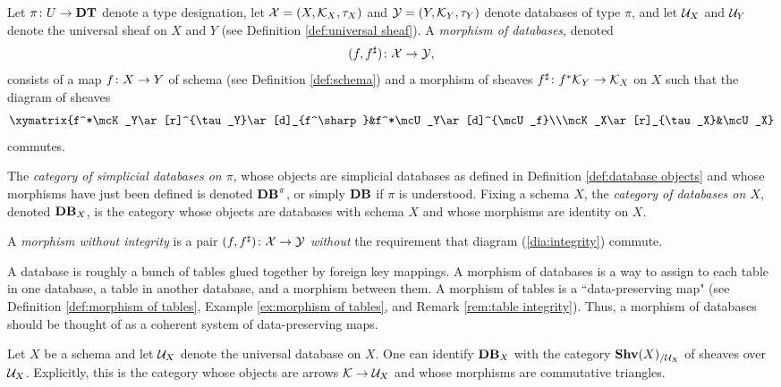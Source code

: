 \documentclass{amsart}
\def\DT{{\bf DT}}
\def\Data{{\bf DB}}
\begin{document}
\begin{definition}\label{def:database morphisms}

Let $\pi\taking U\to\DT$ denote a type designation, let $\mathcal{X}=(X,\mathcal{K}_X,\tau_X)$ and $\mathcal{Y}=(Y,\mathcal{K}_Y,\tau_Y)$ denote databases of type $\pi$, and let $\mathcal{U}_X$ and $\mathcal{U}_Y$ denote the universal sheaf on $X$ and $Y$ (see Definition \ref{def:universal sheaf}).  A {\em morphism of databases}, denoted $$(f,f^\sharp)\colon\mathcal{X}\rightarrow\mathcal{Y},$$ consists of a map $f\colon X\rightarrow Y$ of schema (see Definition \ref{def:schema}) and a morphism of sheaves $f^\sharp\colon f^*\mathcal{K}_Y\rightarrow\mathcal{K}_X$ on $X$ such that the diagram of sheaves \begin{eqnarray}\label{dia:integrity}\xymatrix{f^*\mcK_Y\ar[r]^{\tau_Y}\ar[d]_{f^\sharp}&f^*\mcU_Y\ar[d]^{\mcU_f}\\\mcK_X\ar[r]_{\tau_X}&\mcU_X}\end{eqnarray} commutes.

The {\em category of simplicial databases on $\pi$}, whose objects are simplicial databases as defined in Definition \ref{def:database objects} and whose morphisms have just been defined is denoted $\Data^\pi$, or simply $\Data$ if $\pi$ is understood.  Fixing a schema $X$, the {\em category of databases on $X$}, denoted $\Data_X$, is the category whose objects are databases with schema $X$ and whose morphisms are identity on $X$.  

A {\em morphism without integrity} is a pair $(f,f^\sharp)\colon\mathcal{X}\rightarrow\mathcal{Y}$ {\em without} the requirement that diagram (\ref{dia:integrity}) commute.

\end{definition}

\begin{remark}\label{rem:data integrity}

A database is roughly a bunch of tables glued together by foreign key mappings.  A morphism of databases is a way to assign to each table in one database, a table in another database, and a morphism between them.  A morphism of tables is a ``data-preserving map" (see Definition \ref{def:morphism of tables}, Example \ref{ex:morphism of tables}, and Remark \ref{rem:table integrity}).  Thus, a morphism of databases should be thought of as a coherent system of data-preserving maps.

\end{remark}

\begin{remark}\label{rem:data_X}

Let $X$ be a schema and let $\mathcal{U}_X$ denote the universal database on $X$.  One can identify $\Data_X$ with the category ${\bf Shv}(X)_{/\mathcal{U}_X}$ of sheaves over $\mathcal{U}_X$.  Explicitly, this is the category whose objects are arrows $\mathcal{K}\rightarrow\mathcal{U}_X$ and whose morphisms are commutative triangles.

\end{remark}
\end{document}

